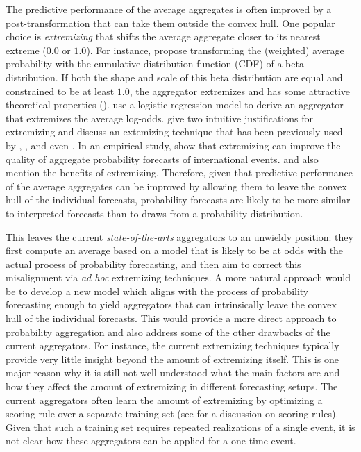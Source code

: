 \documentclass[11pt]{article}
\theoremstyle{definition}
\theoremstyle{definition}
\begin{document}
The predictive performance of the average aggregates is often improved by a post-transformation that can take them outside the convex hull. One popular choice is \textit{extremizing} that shifts the average aggregate closer to its nearest extreme ($0.0$ or $1.0$). 
For instance, \cite{Ranjan08} propose transforming the (weighted) average probability with the cumulative distribution function (CDF) of a beta distribution. If both the shape and scale of this beta distribution are equal and constrained to be at least $1.0$,  the aggregator extremizes and has some attractive theoretical properties (\cite{Wallsten2001}). \cite{satopaa} use a logistic regression model to derive an aggregator that extremizes the average log-odds. \cite{baron2014two} give two intuitive justifications for extremizing and discuss an extemizing technique that has been previously used by \cite{Erev1994}, \cite{shlomi2010subjective}, and even \cite{karmarkar1978subjectively}. In an empirical study, \cite{mellers2014psychological} show that extremizing can improve the quality of aggregate probability forecasts of international events.   \cite{turner2013forecast} and \cite{Ariely00theeffects} also mention the benefits of extremizing. Therefore, given that predictive performance of the average aggregates can be improved by allowing them to leave the convex hull of the individual forecasts, probability forecasts are likely to be more similar to interpreted forecasts than to draws from a probability distribution. 



This leaves the current \textit{state-of-the-arts} aggregators to an unwieldy position: they first compute an average based on a model that is likely to be at odds with the actual process of probability forecasting, and then aim to correct this misalignment via \textit{ad hoc} extremizing techniques. A more natural approach would be to develop a new model which aligns with the process of probability forecasting enough to yield aggregators that can intrinsically leave the convex hull of the individual forecasts. This would provide a more direct approach to probability aggregation and also address some of the other drawbacks of the current aggregators. For instance, the current extremizing techniques typically provide very little insight beyond the amount of extremizing itself. This is one major reason why it is still not well-understood what the main factors are and how they affect the amount of extremizing in different forecasting setups. The current aggregators often learn the amount of extremizing  by optimizing a scoring rule over a separate training set (see \cite{Gneiting04strictlyproper} for a discussion on scoring rules). Given that such a training set requires repeated realizations of a single event, it is not clear how these aggregators can be applied for a one-time event.
\end{document}
